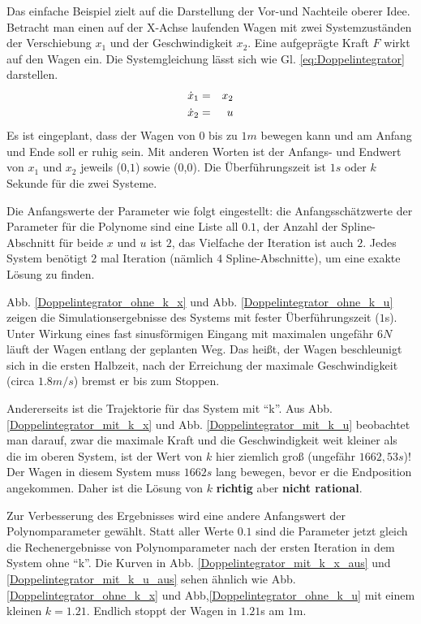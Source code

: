 \begin{beispiel}[Doppelintegrator]
	Das einfache Beispiel zielt auf die Darstellung der Vor-und Nachteile oberer Idee. Betracht man einen auf der X-Achse laufenden Wagen mit zwei Systemzuständen der Verschiebung $x_{1}$ und der Geschwindigkeit $x_{2}$. Eine aufgeprägte Kraft $F$ wirkt auf den Wagen ein. Die Systemgleichung lässt sich wie Gl. \ref{eq:Doppelintegrator} darstellen.
	\begin{eqnarray}
	\dot{x}_{1} &=& x_{2}\notag\\
	\dot{x}_{2} &=& u
	\label{eq:Doppelintegrator}
	\end{eqnarray}
	Es ist eingeplant, dass der Wagen von $0$ bis zu $1m$ bewegen kann und am Anfang und Ende soll er ruhig sein. Mit anderen Worten ist der Anfangs- und Endwert von $x_{1}$ und $x_{2}$ jeweils ($0$,$1$) sowie ($0$,$0$). Die Überführungszeit ist $1s$ oder $k$ Sekunde für die zwei Systeme. 
	
	Die Anfangswerte der Parameter wie folgt eingestellt: die Anfangsschätzwerte der Parameter für die Polynome sind eine Liste all $0.1$, der Anzahl der Spline-Abschnitt für beide $x$ und $u$ ist $2$, das Vielfache der Iteration ist auch $2$. Jedes System benötigt $2$ mal Iteration (nämlich $4$ Spline-Abschnitte), um eine exakte Lösung zu finden.
	
	Abb. \ref{Doppelintegrator_ohne_k_x} und Abb. \ref{Doppelintegrator_ohne_k_u} zeigen die Simulationsergebnisse des Systems mit fester Überführungszeit ($1$s). Unter Wirkung  eines fast sinusförmigen Eingang mit maximalen ungefähr $6N$ läuft der Wagen entlang der geplanten Weg. Das heißt, der Wagen beschleunigt sich in die ersten Halbzeit, nach der Erreichung der maximale Geschwindigkeit (circa $1.8m/s$) bremst er bis zum Stoppen.
	
	Andererseits ist die Trajektorie für das System mit ``k''. Aus Abb. \ref{Doppelintegrator_mit_k_x} und Abb. \ref{Doppelintegrator_mit_k_u} beobachtet man darauf, zwar die maximale Kraft und die Geschwindigkeit weit kleiner als die im oberen System, ist der Wert von $k$ hier ziemlich groß (ungefähr $1662,53s$)! Der Wagen in diesem System muss $1662s$ lang bewegen, bevor er die Endposition angekommen. Daher ist die Lösung von $k$ \textbf{richtig} aber \textbf{nicht rational}.
	
	Zur Verbesserung des Ergebnisses wird eine andere Anfangswert der Polynomparameter gewählt. Statt aller Werte $0.1$ sind die Parameter jetzt gleich die Rechenergebnisse von Polynomparameter nach der ersten Iteration in dem System ohne ``k''. Die Kurven in Abb. \ref{Doppelintegrator_mit_k_x_aus} und \ref{Doppelintegrator_mit_k_u_aus} sehen ähnlich wie Abb. \ref{Doppelintegrator_ohne_k_x} und Abb,\ref{Doppelintegrator_ohne_k_u} mit einem kleinen $k=1.21$. Endlich stoppt der Wagen in $1.21$s am $1$m. 
\end{beispiel}

